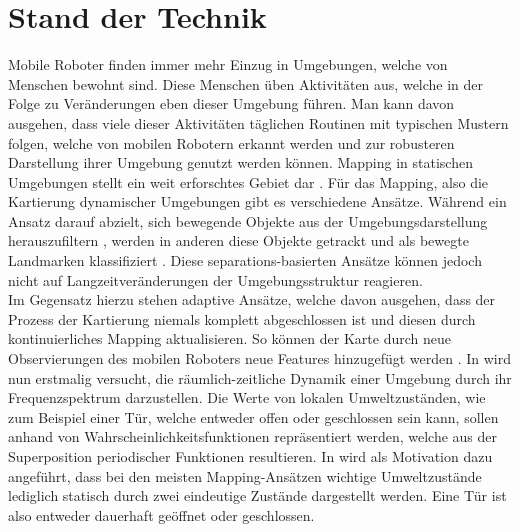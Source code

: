 \chapter{Stand der Technik}
Mobile Roboter finden immer mehr Einzug in Umgebungen, welche von Menschen bewohnt sind. Diese Menschen üben Aktivitäten aus, welche in der Folge zu Veränderungen eben dieser Umgebung führen. Man kann davon ausgehen, dass viele dieser Aktivitäten täglichen Routinen mit typischen Mustern folgen, welche von mobilen Robotern erkannt werden und zur robusteren Darstellung ihrer Umgebung genutzt werden können. Mapping in statischen Umgebungen stellt ein weit erforschtes Gebiet dar \cite{Eichler.2006}.
Für das Mapping, also die Kartierung dynamischer Umgebungen gibt es verschiedene Ansätze. Während ein Ansatz darauf abzielt, sich bewegende Objekte aus der Umgebungsdarstellung herauszufiltern \cite{Hahnel.2002}, werden in anderen diese Objekte getrackt und als bewegte Landmarken klassifiziert \cite{Montesano.2008}. Diese separations-basierten Ansätze können jedoch nicht auf Langzeitveränderungen der Umgebungsstruktur reagieren. \\
Im Gegensatz hierzu stehen adaptive Ansätze, welche davon ausgehen, dass der Prozess der Kartierung niemals komplett abgeschlossen ist und diesen durch kontinuierliches Mapping aktualisieren. So können der Karte durch neue Observierungen des mobilen Roboters neue Features hinzugefügt werden 
\cite{Milford.2010}. In \cite{Krajnik.2014} wird nun erstmalig versucht, die räumlich-zeitliche Dynamik einer Umgebung durch ihr Frequenzspektrum darzustellen. Die Werte von lokalen Umweltzuständen, wie zum Beispiel einer Tür, welche entweder offen oder geschlossen sein kann, sollen anhand von Wahrscheinlichkeitsfunktionen repräsentiert werden, welche aus der Superposition periodischer Funktionen resultieren. In \cite{Krajnik.2014} wird als Motivation dazu angeführt, dass bei den meisten Mapping-Ansätzen wichtige Umweltzustände lediglich statisch durch zwei eindeutige Zustände dargestellt werden. Eine Tür ist also entweder dauerhaft geöffnet oder geschlossen. %
